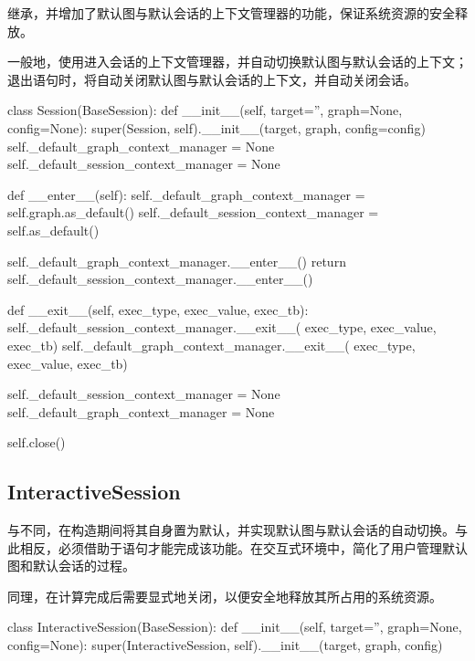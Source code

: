 \begin{content}
\begin{content}
继承，并增加了默认图与默认会话的上下文管理器的功能，保证系统资源的安全释放。

一般地，使用进入会话的上下文管理器，并自动切换默认图与默认会话的上下文；退出语句时，将自动关闭默认图与默认会话的上下文，并自动关闭会话。

\begin{leftbar}
\begin{python}
class Session(BaseSession):
  def __init__(self, target='', graph=None, config=None):
    super(Session, self).__init__(target, graph, config=config)
    self._default_graph_context_manager = None
    self._default_session_context_manager = None

  def __enter__(self):
    self._default_graph_context_manager = self.graph.as_default()
    self._default_session_context_manager = self.as_default()

    self._default_graph_context_manager.__enter__()
    return self._default_session_context_manager.__enter__()

  def __exit__(self, exec_type, exec_value, exec_tb):
    self._default_session_context_manager.__exit__(
        exec_type, exec_value, exec_tb)
    self._default_graph_context_manager.__exit__(
        exec_type, exec_value, exec_tb)

    self._default_session_context_manager = None
    self._default_graph_context_manager = None

    self.close()
\end{python}
\end{leftbar}

\subsection{InteractiveSession}

与不同，在构造期间将其自身置为默认，并实现默认图与默认会话的自动切换。与此相反，必须借助于语句才能完成该功能。在交互式环境中，简化了用户管理默认图和默认会话的过程。

同理，在计算完成后需要显式地关闭，以便安全地释放其所占用的系统资源。

\begin{leftbar}
\begin{python}
class InteractiveSession(BaseSession):
  def __init__(self, target='', graph=None, config=None):
    super(InteractiveSession, self).__init__(target, graph, config)


\end{python}
\end{leftbar}
\end{content}
\end{content}

